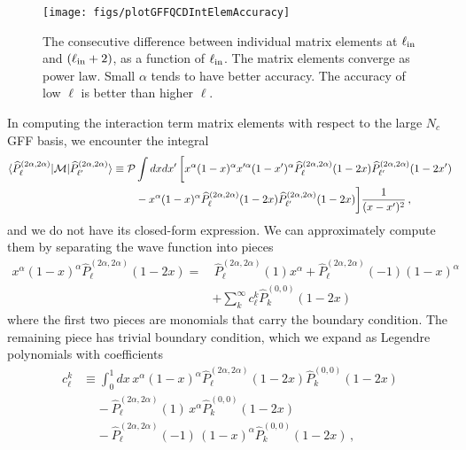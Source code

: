 \documentclass[12pt]{article}
\def\>{\rangle}
\def\<{\langle}
\newcommand{\CM}{{\cal M}}
\newcommand{\nn}{\nonumber}
\begin{document}
    \begin{figure}[htbp]
    \centering
    \texttt{[image: figs/plotGFFQCDIntElemAccuracy]}
    \caption{\label{fig:plotGFFQCDIntElemAccuracy}
    The consecutive difference between individual matrix elements at $\ell_{\rm in}$ and $(\ell_{\rm in}+2)$, as a function of $\ell_{\rm in}$. The matrix elements converge as power law. Small $\alpha$ tends to have better accuracy. The accuracy of low $\ell$ is better than higher $\ell$. 
    }
    \end{figure}
    In computing the interaction term matrix elements with respect to the large $N_c$ GFF basis, we encounter the integral
    \begin{align}
    \label{eq:QCDIntElemGFFBasis}
    \< \widehat{P}_{\ell}^{(2\alpha,2\alpha)}| \CM | \widehat{P}_{\ell'}^{(2\alpha,2\alpha)} \>
    \equiv 
    \mathcal{P}
     &\int dx dx' \, 
    \bigg[
    x^{\alpha}
    (1-x)^{\alpha}
    x'^{\alpha}
    (1-x')^{\alpha}
    \widehat{P}_{\ell}^{(2\alpha,2\alpha)}(1-2x)
    \widehat{P}_{\ell'}^{(2\alpha,2\alpha)}(1-2x')
    \nn\\
    &-x^\alpha (1-x)^\alpha
    \widehat{P}_{\ell}^{(2\alpha,2\alpha)}(1-2x)
    \widehat{P}_{\ell'}^{(2\alpha,2\alpha)}(1-2x)
    \bigg]
    \frac{1}{(x-x')^2}
      \, ,
    \end{align}
    and we do not have its closed-form expression. We can approximately compute them by separating the wave function into pieces
    \begin{align}
    \label{eq:expandingGFFBasisAsLegendre}
    x^{\alpha}(1-x)^{\alpha}
    \widehat{P}_{\ell}^{(2\alpha,2\alpha)}(1-2x)
    = &\, \widehat{P}_{\ell}^{(2\alpha,2\alpha)}(1) x^{\alpha}
    + \widehat{P}_{\ell}^{(2\alpha,2\alpha)}(-1) (1-x)^{\alpha} \nn \\
    &+ \sum_k^\infty c_\ell^k  \widehat{P}_{k}^{(0,0)}(1-2x)
    \end{align}
    where the first two pieces are monomials that carry the boundary condition. The remaining piece has trivial boundary condition, which we expand as Legendre polynomials with coefficients
    \begin{align}
    c_\ell^k &\equiv 
    \int_0^1 dx\,   x^{\alpha}(1-x)^{\alpha}
    \widehat{P}_{\ell}^{(2\alpha,2\alpha)}(1-2x) 
     \widehat{P}_{k}^{(0,0)}(1-2x)  \nn \\
    &~~~~~- \widehat{P}_{\ell}^{(2\alpha,2\alpha)}(1) \,
    x^{\alpha} 
     \widehat{P}_{k}^{(0,0)}(1-2x) \nn \\
    &~~~~~- \widehat{P}_{\ell}^{(2\alpha,2\alpha)}(-1) \,
     (1-x)^{\alpha}
     \widehat{P}_{k}^{(0,0)}(1-2x) \, ,
    \end{align}
\end{document}
